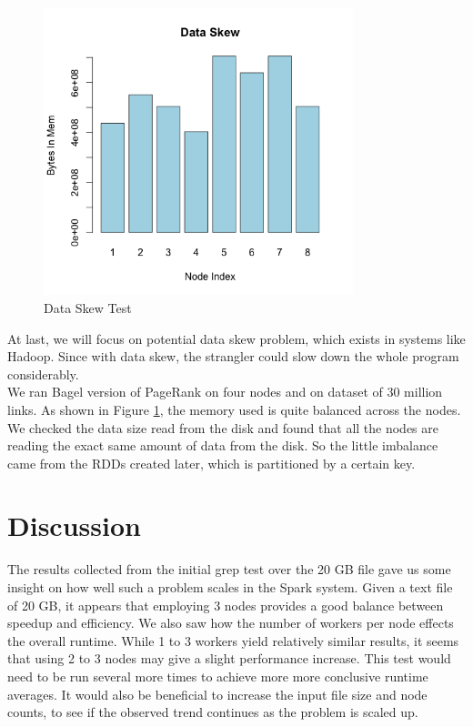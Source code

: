 \documentclass{article}
\begin{document}
\begin{figure}[H]
        \centering
        \includegraphics[width=90mm]{images/skew.png}
        \caption{Data Skew Test}
        \label{fig:dataskew}
    \end{figure}

At last, we will focus on potential data skew problem, which exists in systems like Hadoop. Since with data skew, the strangler could slow down the whole program considerably.\\

We ran Bagel version of PageRank on four nodes and on dataset of 30 million links. As shown in Figure \ref{fig:dataskew}, the memory used is quite balanced across the nodes. We checked the data size read from the disk and found that all the nodes are reading the exact same amount of data from the disk. So the little imbalance came from the RDDs created later, which is partitioned by a certain key. \\



\section{Discussion}
The results collected from the initial grep test over the 20 GB file gave us
some insight on how well such a problem scales in the Spark system. Given a
text file of 20 GB, it appears that employing 3 nodes provides a good balance
between speedup and efficiency. We also saw how the number of workers per node
effects the overall runtime. While 1 to 3 workers yield relatively similar
results, it seems that using 2 to 3 nodes may give a slight performance
increase. This test would need to be run several more times to achieve more
more conclusive runtime averages. It would also be beneficial to increase the
input file size and node counts, to see if the observed trend continues as the
problem is scaled up.
\end{document}
